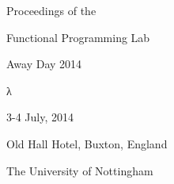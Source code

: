 \documentclass[a4paper]{report}
\begin{document}
\pagestyle{empty}

\begin{center}

\mbox{}
\vspace{2cm}

{\LARGE{Proceedings of the}}

\vspace{0.5cm}

{\Huge{Functional Programming Lab}}

\vspace{0.3cm}

{\Huge{Away Day 2014}}

\vspace{3cm}

{\fontsize{6cm}{1em} {\unicodefont λ}}



\vspace{3cm}

{\large{3-4 July, 2014}}

\vspace{0.2cm}

{\large{Old Hall Hotel, Buxton, England}}

\vspace{3cm}



{\large{The University of Nottingham}}

\end{center}

\vspace{1cm}
\end{document}
